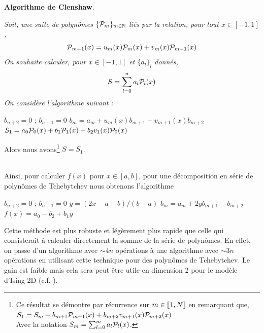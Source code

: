 \documentclass[10.5pt]{article}
\begin{document}
\begin{multicols*}{2}
\noindent
\textbf{Algorithme de Clenshaw}. {\itshape
Soit, une suite de polynômes $\{\mathcal{P}_m\}_{m \in \mathbb{N}}$ liés par la relation, pour tout $x \in [-1,1]$, 
\begin{equation}
 \mathcal{P}_{m+1}(x) = u_m(x)\mathcal{P}_m(x) + v_m(x)\mathcal{P}_{m-1}(x)
\end{equation}
On souhaite calculer, pour $x \in [-1, 1]$ et $\{a_l\}_l$ donnés, 
\begin{equation}
  S = \sum_{l=0}^{n} a_l \mathcal{P}_l(x)
\end{equation}
On considère l'algorithme suivant :
\vspace*{-11pt}
\begin{algorithm}[H]
  \begin{algorithmic}[1]
    \STATE $b_{n+2} = 0$ ; $b_{n+1} = 0$
    \STATE $b_m = a_m + u_m(x)b_{m+1} + v_{m+1}(x)b_{m+2}$
    \ENDFOR
    \STATE $S_1 = a_0\mathcal{P}_0(x) + b_1\mathcal{P}_1(x) + b_2v_1(x)\mathcal{P}_0(x)$
  \end{algorithmic}
\end{algorithm}
\vspace*{-11pt}
\noindent
Alors nous avons\footnote{Ce résultat se démontre par récurrence sur $m \in  \llbracket 1,N \rrbracket $ en remarquant que,
$S_1 = S_m +  b_{m+1}\mathcal{P}_{m+1}(x) + b_{m+2}v_{m+1}(x)\mathcal{P}_{m+2}(x)$\\
Avec la notation $S_m = \sum_{l=0}^{m} a_l \mathcal{P}_l(x)$.} $S = S_1$. 
} \\

Ainsi, pour calculer $f(x)$ pour $x \in [a,b]$, pour une décomposition en série de polynômes de Tchebytchev nous obtenons l'algorithme

\begin{algorithm}[H]
  \begin{algorithmic}[1]
    \STATE $b_{n+2} = 0$ ; $b_{n+1} = 0$
    \STATE $y = (2x-a-b)/(b-a)$
    \STATE $b_m = a_m + 2yb_{m+1} - b_{m+2}$
    \ENDFOR
    \STATE $f(x) = a_0 - b_2 + b_1y$
  \end{algorithmic}
\end{algorithm}

Cette méthode \cite{clenshaw1955note} est plus robuste et légèrement plus rapide que celle qui consisterait à calculer directement la somme de la série de polynômes. En effet, on passe d'un algorithme avec $\sim 4n$ opérations à une algorithme avec $\sim 3n$ opérations en utilisant cette technique pour des polynômes de Tchebytchev. Le gain est faible mais cela sera peut être utile en dimension 2 pour le modèle d'Ising 2D (c.f. ). \\



\end{multicols*}
\end{document}

